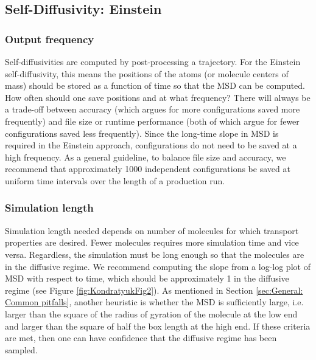 \documentclass[9pt,bestpractices]{livecoms}
\begin{document}
\subsection{Self-Diffusivity: Einstein} \label{sec:Self-Diffusivity Einstein}


\subsubsection{Output frequency} \label{sec:Self-Diffusivity:Einstein: Output frequency}

Self-diffusivities are computed by post-processing a trajectory. For the Einstein self-diffusivity, this means the positions of the atoms (or molecule centers of mass) should be stored as a function of time so that the MSD can be computed. How often should one save positions and at what frequency? There will always be a trade-off between accuracy (which argues for more configurations saved more frequently) and file size or runtime performance (both of which argue for fewer configurations saved less frequently). Since the long-time slope in MSD is required in the Einstein approach, configurations do not need to be saved at a high frequency. As a general guideline, to balance file size and accuracy, we recommend that approximately 1000 independent configurations be saved at uniform time intervals over the length of a production run.

\subsubsection{Simulation length} \label{sec:Self-Diffusivity:Einstein: Simulation length}

Simulation length needed depends on number of molecules for which transport properties are desired. Fewer molecules requires more simulation time and vice versa. %
Regardless, the simulation must be long enough so that the molecules are in the diffusive regime. We recommend computing the slope from a log-log plot of MSD with respect to time, which should be approximately 1 in the diffusive regime (see Figure \ref{fig:KondratyukFig2}). As mentioned in Section \ref{sec:General: Common pitfalls}, another heuristic is whether the MSD is sufficiently large, i.e. larger than the square of the radius of gyration of the molecule at the low end and larger than the square of half the box length at the high end. If these criteria are met, then one can have confidence that the diffusive regime has been sampled.
\end{document}
